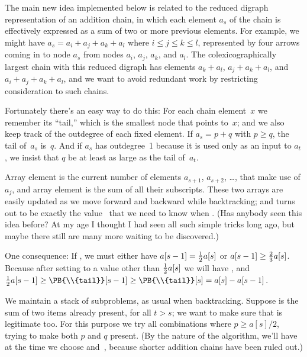 The main new idea implemented below is related to the reduced digraph
representation of an addition chain, in which each element $a_s$
of the chain is effectively expressed as a sum of two or
more previous elements. For example, we might have $a_s=a_i+a_j+a_k+a_l$
where $i\le j\le k\le l$, represented by four arrows coming in to
node $a_s$ from nodes $a_i$, $a_j$, $a_k$, and $a_l$. The
colexicographically largest chain with this reduced digraph has
elements $a_k+a_l$, $a_j+a_k+a_l$, and $a_i+a_j+a_k+a_l$, and
we want to avoid redundant work by restricting consideration to such chains.

Fortunately there's an easy way to do this: For each chain element~$x$
we remember its ``tail,'' which is the smallest node that points to~$x$;
and we also keep track of the outdegree of each fixed element. If
$a_s=p+q$ with $p\ge q$, the tail of~$a_s$ is~$q$. And if $a_s$ has
outdegree~1 because it is used only as an input to $a_t$, we
insist that $q$ be at least as large as the tail of~$a_t$.

Array element  is the current number of elements
$a_{s+1}$, $a_{s+2}$, \dots, that make use of $a_j$, and
array element  is the sum of all their subscripts.
These two arrays are easily updated as we move forward and backward
while backtracking; and  turns out to be exactly the
value~ that we need to know when .
(Has anybody seen this idea before? At my age I thought I had
seen all such simple tricks long ago, but maybe there still
are many more waiting to be discovered.)

One consequence: If , we must either have
$a[s-1]={1\over2}a[s]$ or $a[s-1]\ge{2\over3}a[s]$. Because
after setting  to a value other than ${1\over2}a[s]$
we will have , and
${1\over2}a[s-1]\ge\PB{\\{tail}}[s-1]\ge\PB{\\{tail}}[s]=a[s]-a[s-1]$.

\fi

We maintain a stack of subproblems, as usual when backtracking.
Suppose  is the sum of two items already present, for all
$t>s$; we want to make sure that  is legitimate too.
For this purpose we try all combinations  where
$p\ge a[s]/2$, trying to make both $p$ and $q$ present.
(By the nature of the algorithm, we'll have  at
the time we choose  and~, because shorter addition
chains have been ruled out.)

